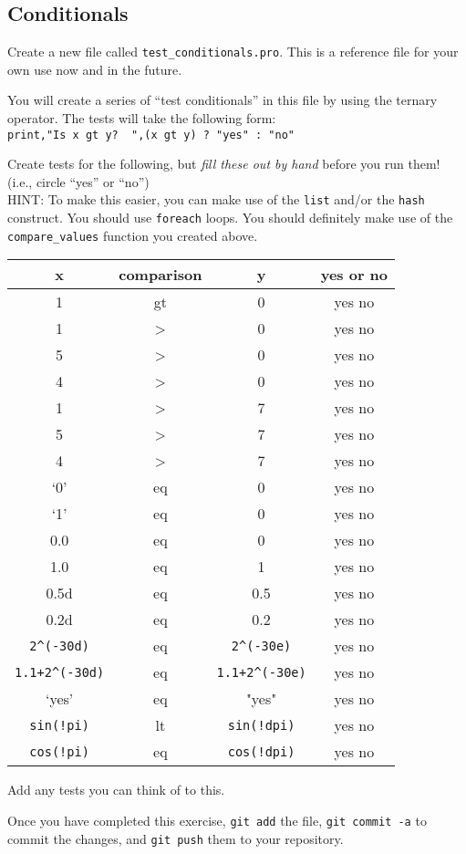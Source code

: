 \documentclass{article}
\begin{document}
\begin{spacing}{1.0}
\section{Conditionals}
Create a new file called \verb|test_conditionals.pro|.  This is a reference
file for your own use now and in the future.

You will create a series of ``test conditionals'' in this file by using the
ternary operator.  The tests will take the following form:\\
\verb|print,"Is x gt y?  ",(x gt y) ? "yes" : "no"|

Create tests for the following, but \emph{fill these out by hand}
before you run them! (i.e., circle ``yes'' or ``no'')\\

HINT: To make this easier, you can make use of the \verb|list| and/or the
\verb|hash| construct.  You should use \verb|foreach| loops.  You should
definitely make use of the \verb|compare_values| function you created above.

{\large
\begin{tabular}{|c|c|c|c|}
    \hline
    x & comparison & y & yes or no \\
    \hline
    1 & gt & 0 & yes no \\ 
    1 & > & 0 & yes no \\ 
    5 & > & 0 & yes no \\ 
    4 & > & 0 & yes no \\ 
    1 & > & 7 & yes no \\ 
    5 & > & 7 & yes no \\ 
    4 & > & 7 & yes no \\ 
    `0' & eq & 0 & yes no \\ 
    `1' & eq & 0 & yes no \\ 
    0.0 & eq & 0 & yes no \\ 
    1.0 & eq & 1 & yes no \\ 
    0.5d & eq & 0.5 & yes no \\ 
    0.2d & eq & 0.2 & yes no \\ 
    \verb|2^(-30d)| & eq & \verb|2^(-30e)|& yes no \\ 
    \verb|1.1+2^(-30d)| & eq & \verb|1.1+2^(-30e)|& yes no \\ 
    `yes' & eq & "yes" & yes no \\ 
    \verb|sin(!pi)| & lt & \verb|sin(!dpi)| & yes no \\ 
    \verb|cos(!pi)| & eq & \verb|cos(!dpi)| & yes no \\ 
    \hline
\end{tabular}
}

Add any tests you can think of to this. 

Once you have completed this exercise, \verb|git add| the file, 
\verb|git commit -a| to commit the changes, and \verb|git push| them to your
repository.

\end{spacing}
\end{document}
